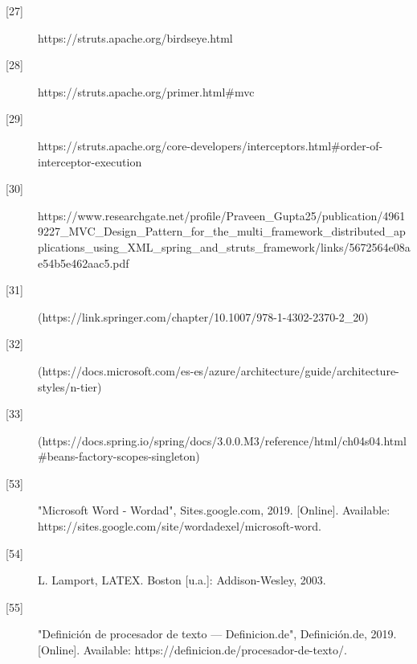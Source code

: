 \begin{description}
		\item[\hypertarget{b27}{[27]}] https://struts.apache.org/birdseye.html 
		
		\item[\hypertarget{b28}{[28]}] https://struts.apache.org/primer.html\#mvc
		
		\item[\hypertarget{b29}{[29]}]
		https://struts.apache.org/core-developers/interceptors.html\#order-of-interceptor-execution
		
		\item[\hypertarget{b30}{[30]}] 	https://www.researchgate.net/profile/Praveen\_Gupta25/publication/49619227\_MVC\_Design\_Pattern\_for\_the\_multi\_framework\_distributed\_applications\_using\_XML\_spring\_and\_struts\_framework/links/5672564e08ae54b5e462aac5.pdf
		
		\item[\hypertarget{b31}{[31]}] (https://link.springer.com/chapter/10.1007/978-1-4302-2370-2\_20)
		\item[\hypertarget{b32}{[32]}] (https://docs.microsoft.com/es-es/azure/architecture/guide/architecture-styles/n-tier)
		\item[\hypertarget{b33}{[33]}](https://docs.spring.io/spring/docs/3.0.0.M3/reference/html/ch04s04.html\#beans-factory-scopes-singleton)
		
		\item[\hypertarget{b53}{[53]}]"Microsoft Word - Wordad", Sites.google.com, 2019. [Online]. Available: https://sites.google.com/site/wordadexel/microsoft-word. 
		
		\item[\hypertarget{b54}{[54]}]L. Lamport, LATEX. Boston [u.a.]: Addison-Wesley, 2003.
		
		\item[\hypertarget{b55}{[55]}]"Definición de procesador de texto — Definicion.de", Definición.de, 2019. [Online]. Available: https://definicion.de/procesador-de-texto/. 
\end{description}
